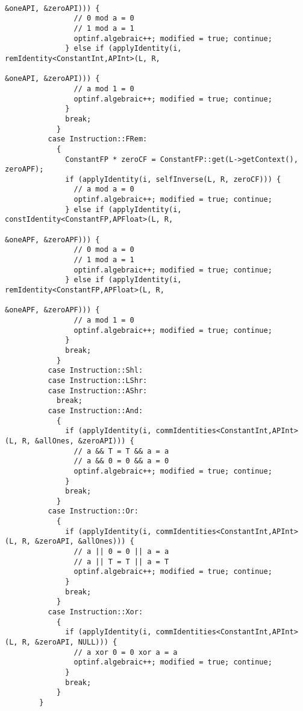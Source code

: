 \documentclass[12pt]{article}
\begin{document}
\begin{verbatim}
                                                                           &oneAPI, &zeroAPI))) {
                // 0 mod a = 0
                // 1 mod a = 1
                optinf.algebraic++; modified = true; continue;
              } else if (applyIdentity(i, remIdentity<ConstantInt,APInt>(L, R, 
                                                                         &oneAPI, &zeroAPI))) {
                // a mod 1 = 0
                optinf.algebraic++; modified = true; continue;
              }
              break;
            }
          case Instruction::FRem:
            {
              ConstantFP * zeroCF = ConstantFP::get(L->getContext(), zeroAPF);
              if (applyIdentity(i, selfInverse(L, R, zeroCF))) {
                // a mod a = 0
                optinf.algebraic++; modified = true; continue;
              } else if (applyIdentity(i, constIdentity<ConstantFP,APFloat>(L, R, 
                                                                            &oneAPF, &zeroAPF))) {
                // 0 mod a = 0
                // 1 mod a = 1
                optinf.algebraic++; modified = true; continue;
              } else if (applyIdentity(i, remIdentity<ConstantFP,APFloat>(L, R, 
                                                                          &oneAPF, &zeroAPF))) {
                // a mod 1 = 0
                optinf.algebraic++; modified = true; continue;
              }
              break;
            }
          case Instruction::Shl:						
          case Instruction::LShr:						
          case Instruction::AShr:					
            break;
          case Instruction::And:					
            {
              if (applyIdentity(i, commIdentities<ConstantInt,APInt>(L, R, &allOnes, &zeroAPI))) {
                // a && T = T && a = a
                // a && 0 = 0 && a = 0
                optinf.algebraic++; modified = true; continue;
              }
              break;
            }
          case Instruction::Or:
            {
              if (applyIdentity(i, commIdentities<ConstantInt,APInt>(L, R, &zeroAPI, &allOnes))) {
                // a || 0 = 0 || a = a
                // a || T = T || a = T
                optinf.algebraic++; modified = true; continue;
              }
              break;
            }
          case Instruction::Xor:
            {
              if (applyIdentity(i, commIdentities<ConstantInt,APInt>(L, R, &zeroAPI, NULL))) {
                // a xor 0 = 0 xor a = a
                optinf.algebraic++; modified = true; continue;
              }
              break;
            }
        }



\end{verbatim}
\end{document}
